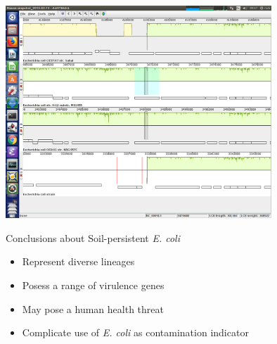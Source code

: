 \documentclass[17pt,aspectratio=169]{beamer}
\begin{document}
\begin{frame}[label={sec:orga25860d}]{}
  \includegraphics[width=10cm]{./2018-03-11_dc_figs/tufA.png}
\end{frame}







\begin{frame}[label={sec:orga1ea581}]{Conclusions about Soil-persistent \emph{E. coli}}
\begin{itemize}
\item Represent diverse lineages
\item Posess a range of virulence genes
\item May pose a human health threat
\item Complicate use of \emph{E. coli} as contamination indicator
\end{itemize}
\end{frame}
\end{document}
